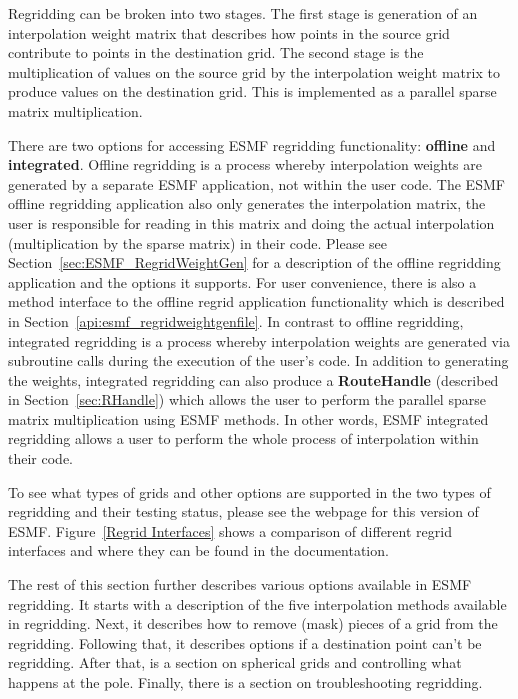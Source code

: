  Regridding can be broken into two stages. The first stage is generation of an interpolation weight matrix that describes how points in 
 the source grid contribute to points in the destination grid. The second stage is the multiplication of values on the source grid by the
 interpolation weight matrix to produce values on the destination grid. This is implemented as a parallel sparse matrix multiplication.

 There are two options for accessing ESMF regridding functionality: {\bf offline} and {\bf integrated}. Offline regridding is a process whereby interpolation 
 weights are generated by a separate ESMF application, not within the user code. The ESMF offline regridding application also only generates the interpolation 
 matrix, the user is responsible for reading in this matrix and doing the actual interpolation (multiplication by the sparse matrix) in their code.
 Please see Section~\ref{sec:ESMF_RegridWeightGen} for a description of the offline regridding application and the options it supports. For user convenience, there
 is also a method interface to the offline regrid application functionality which is described in Section~\ref{api:esmf_regridweightgenfile}.
 In contrast to offline regridding, integrated regridding is a process whereby interpolation weights are generated via subroutine calls during the
 execution of the user's code. In addition to generating the weights, integrated regridding can also produce a {\bf RouteHandle} (described in Section~\ref{sec:RHandle}) which allows the user to perform the parallel sparse 
 matrix multiplication using ESMF methods. In other words, ESMF integrated regridding allows a user to perform the whole process of interpolation within their code. 

 To see what types of grids and other options are supported in the two types of regridding and their testing status, please see the  webpage for this version of ESMF.
 Figure~\ref{Regrid Interfaces} shows a comparison of different regrid interfaces and where they can be found in the documentation. 

 The rest of this section further describes various options available in ESMF regridding. It starts with a description of the five interpolation methods available in regridding.
 Next, it describes how to remove (mask) pieces of a grid from the regridding. Following that, it describes options if a destination point can't be regridding. After that, is a section
 on spherical grids and controlling what happens at the pole. Finally, there is a section on troubleshooting regridding.  

